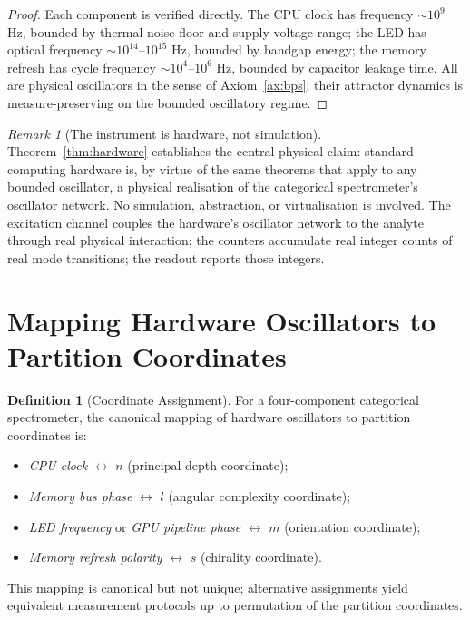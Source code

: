 \documentclass[twocolumn,11pt,a4paper]{article}
\theoremstyle{thmstyle}
\theoremstyle{axiomstyle}
\theoremstyle{definition}
\newtheorem{definition}[theorem]{Definition}
\theoremstyle{remark}
\newtheorem*{remark}{Remark}
\begin{document}
\begin{proof}
Each component is verified directly. The CPU clock has frequency $\sim 10^{9}$ Hz, bounded by thermal-noise floor and supply-voltage range; the LED has optical frequency $\sim 10^{14}$--$10^{15}$ Hz, bounded by bandgap energy; the memory refresh has cycle frequency $\sim 10^{4}$--$10^{6}$ Hz, bounded by capacitor leakage time. All are physical oscillators in the sense of Axiom~\ref{ax:bps}; their attractor dynamics is measure-preserving on the bounded oscillatory regime.
\end{proof}

\begin{remark}[The instrument is hardware, not simulation]
Theorem~\ref{thm:hardware} establishes the central physical claim: standard computing hardware is, by virtue of the same theorems that apply to any bounded oscillator, a physical realisation of the categorical spectrometer's oscillator network. No simulation, abstraction, or virtualisation is involved. The excitation channel couples the hardware's oscillator network to the analyte through real physical interaction; the counters accumulate real integer counts of real mode transitions; the readout reports those integers.
\end{remark}

\section{Mapping Hardware Oscillators to Partition Coordinates}
\label{sec:mapping}

\begin{definition}[Coordinate Assignment]\label{def:assignment}
For a four-component categorical spectrometer, the canonical mapping of hardware oscillators to partition coordinates is:
\begin{itemize}[nosep]
\item \emph{CPU clock} $\leftrightarrow$ $n$ (principal depth coordinate);
\item \emph{Memory bus phase} $\leftrightarrow$ $l$ (angular complexity coordinate);
\item \emph{LED frequency} or \emph{GPU pipeline phase} $\leftrightarrow$ $m$ (orientation coordinate);
\item \emph{Memory refresh polarity} $\leftrightarrow$ $s$ (chirality coordinate).
\end{itemize}
This mapping is canonical but not unique; alternative assignments yield equivalent measurement protocols up to permutation of the partition coordinates.
\end{definition}
\end{document}
